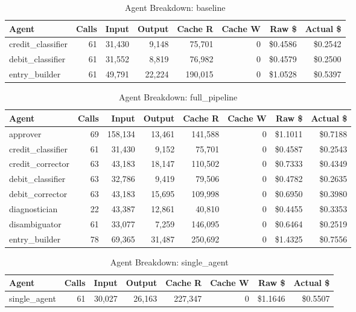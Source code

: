 \begin{table}[htbp]
\centering
\caption{Agent Breakdown: baseline}
\label{tab:agent-baseline}
\begin{tabular}{l r rr rr rr}
\toprule
Agent & Calls & Input & Output & Cache R & Cache W & Raw \$ & Actual \$ \\
\midrule
  credit\_classifier & 61 & 31,430 & 9,148 & 75,701 & 0 & \$0.4586 & \$0.2542 \\
  debit\_classifier & 61 & 31,552 & 8,819 & 76,982 & 0 & \$0.4579 & \$0.2500 \\
  entry\_builder & 61 & 49,791 & 22,224 & 190,015 & 0 & \$1.0528 & \$0.5397 \\
\bottomrule
\end{tabular}
\end{table}

\begin{table}[htbp]
\centering
\caption{Agent Breakdown: full\_pipeline}
\label{tab:agent-full-pipeline}
\begin{tabular}{l r rr rr rr}
\toprule
Agent & Calls & Input & Output & Cache R & Cache W & Raw \$ & Actual \$ \\
\midrule
  approver & 69 & 158,134 & 13,461 & 141,588 & 0 & \$1.1011 & \$0.7188 \\
  credit\_classifier & 61 & 31,430 & 9,152 & 75,701 & 0 & \$0.4587 & \$0.2543 \\
  credit\_corrector & 63 & 43,183 & 18,147 & 110,502 & 0 & \$0.7333 & \$0.4349 \\
  debit\_classifier & 63 & 32,786 & 9,419 & 79,506 & 0 & \$0.4782 & \$0.2635 \\
  debit\_corrector & 63 & 43,183 & 15,695 & 109,998 & 0 & \$0.6950 & \$0.3980 \\
  diagnostician & 22 & 43,387 & 12,861 & 40,810 & 0 & \$0.4455 & \$0.3353 \\
  disambiguator & 61 & 33,077 & 7,259 & 146,095 & 0 & \$0.6464 & \$0.2519 \\
  entry\_builder & 78 & 69,365 & 31,487 & 250,692 & 0 & \$1.4325 & \$0.7556 \\
\bottomrule
\end{tabular}
\end{table}

\begin{table}[htbp]
\centering
\caption{Agent Breakdown: single\_agent}
\label{tab:agent-single-agent}
\begin{tabular}{l r rr rr rr}
\toprule
Agent & Calls & Input & Output & Cache R & Cache W & Raw \$ & Actual \$ \\
\midrule
  single\_agent & 61 & 30,027 & 26,163 & 227,347 & 0 & \$1.1646 & \$0.5507 \\
\bottomrule
\end{tabular}
\end{table}

